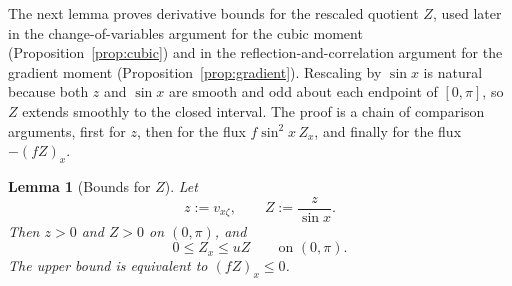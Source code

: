 \documentclass{amsart}
\newtheorem{lemma}[theorem]{Lemma}
\begin{document}
The next lemma proves derivative bounds for the rescaled quotient
$Z$, used later in the change-of-variables argument for the
cubic moment (Proposition~\ref{prop:cubic}) and in the
reflection-and-correlation argument for the gradient moment
(Proposition~\ref{prop:gradient}).
Rescaling by $\sin x$ is natural because both $z$ and $\sin x$ are
smooth and odd about each endpoint of $[0,\pi]$, so $Z$ extends
smoothly to the closed interval. The proof is a chain of comparison
arguments, first for $z$, then for the flux $f\sin^2x\,Z_x$, and
finally for the flux $-(fZ)_x$.

\begin{lemma}[Bounds for $Z$]\label{lem:Z-bounds}
Let
\[
z:=v_{x\zeta},\qquad Z:=\frac{z}{\sin x}.
\]
Then $z>0$ and $Z>0$ on $(0,\pi)$, and
\[
0\leq Z_x\leq uZ\qquad\text{on }(0,\pi).
\]
The upper bound is equivalent to $(fZ)_x\leq 0$.
\end{lemma}
\end{document}
